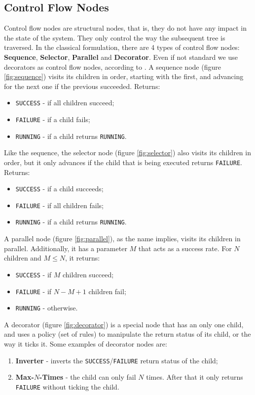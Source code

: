 \documentclass[a4paper,UKenglish,cleveref, autoref, thm-restate]{oasics-v2019}
\begin{document}
\subsection{Control Flow Nodes}
Control flow nodes are structural nodes, that is, they do not have any impact in the state of the system. They only control the way the subsequent tree is traversed.
In the classical formulation, there are 4 types of control flow nodes: \textbf{Sequence}, \textbf{Selector}, \textbf{Parallel} and \textbf{Decorator}.
Even if not standard we use decorators as control flow nodes, according to \cite{ColOgr2018}.
A sequence node (figure \ref{fig:sequence}) visits its children in order, starting with the first, and advancing for the next one if the previous succeeded.
Returns:
\begin{itemize}
    \item \texttt{SUCCESS} - if all children succeed;
    \item \texttt{FAILURE} - if a child fails;
    \item \texttt{RUNNING} - if a child returns \texttt{RUNNING}.
\end{itemize}


Like the sequence, the selector node (figure \ref{fig:selector}) also visits its children in order, but it only advances if the child that is being executed returns \texttt{FAILURE}.
Returns:
\begin{itemize}
    \item \texttt{SUCCESS} - if a child succeeds;
    \item \texttt{FAILURE} - if all children fails;
    \item \texttt{RUNNING} - if a child returns \texttt{RUNNING}.
\end{itemize}


A parallel node (figure \ref{fig:parallel}), as the name implies, visits its children in parallel.
Additionally, it has a parameter $M$ that acts as a success rate.
For $N$ children and $M \leq N$, it returns:
\begin{itemize}
    \item \texttt{SUCCESS} - if $M$ children succeed;
    \item \texttt{FAILURE} - if $N - M + 1$ children fail;
    \item \texttt{RUNNING} - otherwise.
\end{itemize}



A decorator (figure \ref{fig:decorator}) is a special node that has an only one child, and uses a policy (set of rules) to manipulate the return status of its child, or the way it ticks it.
Some examples of decorator nodes are:
\begin{enumerate}
    \item \textbf{Inverter} - inverts the \texttt{SUCCESS}/\texttt{FAILURE} return status of the child;
    \item \textbf{Max-$N$-Times} - the child can only fail $N$ times.
    After that it only returns \texttt{FAILURE} without ticking the child.
\end{enumerate}
\end{document}
